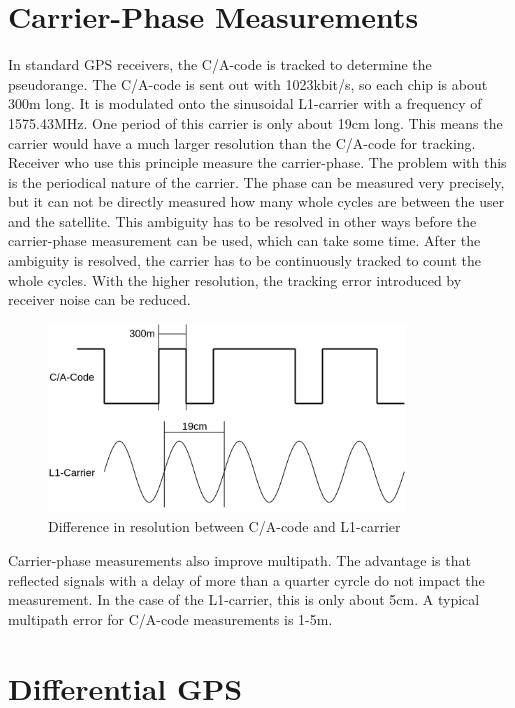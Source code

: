 \section{Carrier-Phase Measurements}

In standard GPS receivers, the C/A-code is tracked to determine the pseudorange.
The C/A-code is sent out with 1023kbit/s, so each chip is about 300m long.
It is modulated onto the sinusoidal L1-carrier with a frequency of 1575.43MHz.
One period of this carrier is only about 19cm long.
This means the carrier would have a much larger resolution than the C/A-code for tracking.
Receiver who use this principle measure the carrier-phase.
The problem with this is the periodical nature of the carrier.
The phase can be measured very precisely, but it can not be directly measured how many whole cycles are between the user and the satellite.
This ambiguity has to be resolved in other ways before the carrier-phase measurement can be used, which can take some time.
After the ambiguity is resolved, the carrier has to be continuously tracked to count the whole cycles.
With the higher resolution, the tracking error introduced by receiver noise can be reduced.

\begin{figure}[ht]
 \centering
 \includegraphics[height=5cm]{images/Carrier-Phase_Measurement.png}
 \caption{Difference in resolution between C/A-code and L1-carrier}
 \label{fig:carrier_phase}
\end{figure}

Carrier-phase measurements also improve multipath.
The advantage is that reflected signals with a delay of more than a quarter cyrcle do not impact the measurement.
In the case of the L1-carrier, this is only about 5cm.
A typical multipath error for C/A-code measurements is 1-5m.


\section{Differential GPS}

